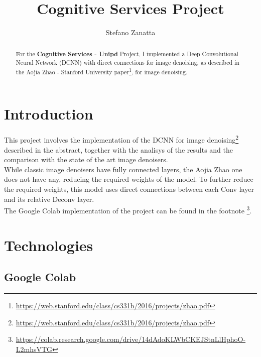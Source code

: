 \documentclass[twocolumn,showpacs,%
  nofootinbib,aps,superscriptaddress,%
  eqsecnum,prd,notitlepage,showkeys,10pt]{revtex4-1}
\begin{document}
\title{Cognitive Services Project}
\author{Stefano Zanatta}

\begin{abstract}
For the \textbf{Cognitive Services - Unipd} Project, I implemented a Deep Convolutional Neural Network (DCNN) with direct connections for image denoising, as described in the Aojia Zhao - Stanford University paper\footnote{\url{https://web.stanford.edu/class/cs331b/2016/projects/zhao.pdf}}, for image denoising.
\end{abstract}

\maketitle

\section{Introduction}
\label{sec:introduction}
This project involves the implementation of the DCNN for image denoising\footnote{\url{https://web.stanford.edu/class/cs331b/2016/projects/zhao.pdf}} described in the abstract, together with the analisys of the results and the comparison with the state of the art image denoisers.\\
While classic image denoisers have fully connected layers, the Aojia Zhao one does not have any, reducing the required weights of the model. To further reduce the required weights, this model uses direct connections between each Conv layer and its relative Deconv layer.\\
The Google Colab implementation of the project can be found in the footnote \footnote{\url{https://colab.research.google.com/drive/14dAdoKLWbCKEJStnLlHphoO-L2mhsVTG}}.

\section{Technologies}
\label{sec:technologies}

\subsection{Google Colab}
\label{subsec:colab}
\end{document}
